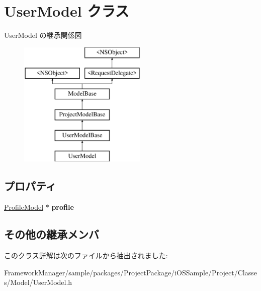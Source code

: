 \hypertarget{interface_user_model}{}\section{User\+Model クラス}
\label{interface_user_model}
User\+Model の継承関係図\begin{figure}[H]
\begin{center}
\leavevmode
\includegraphics[height=6.000000cm]{interface_user_model}
\end{center}
\end{figure}
\subsection*{プロパティ}
\begin{DoxyCompactItemize}
\item 
\hypertarget{interface_user_model_a12872b92d38a6afffb89e71056e6d444}{}\hyperlink{interface_profile_model}{Profile\+Model} $\ast$ {\bfseries profile}\label{interface_user_model_a12872b92d38a6afffb89e71056e6d444}

\end{DoxyCompactItemize}
\subsection*{その他の継承メンバ}


このクラス詳解は次のファイルから抽出されました\+:\begin{DoxyCompactItemize}
\item 
Framework\+Manager/sample/packages/\+Project\+Package/i\+O\+S\+Sample/\+Project/\+Classes/\+Model/User\+Model.\+h\end{DoxyCompactItemize}

